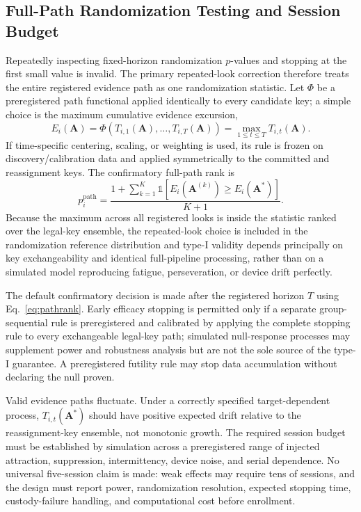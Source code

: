 \documentclass[11pt,letterpaper]{article}
\begin{document}
\subsection{Full-Path Randomization Testing and Session Budget}
\label{sec:sequential}
Repeatedly inspecting fixed-horizon randomization $p$-values and stopping at the first small value is invalid. The primary repeated-look correction therefore treats the entire registered evidence path as one randomization statistic. Let $\Phi$ be a preregistered path functional applied identically to every candidate key; a simple choice is the maximum cumulative evidence excursion,
\begin{equation}
E_i(\mathbf{A})=\Phi\!\left(T_{i,1}(\mathbf{A}),\ldots,T_{i,T}(\mathbf{A})\right)
=\max_{1\leq t\leq T} T_{i,t}(\mathbf{A}).
\label{eq:pathstat}
\end{equation}
If time-specific centering, scaling, or weighting is used, its rule is frozen on discovery/calibration data and applied symmetrically to the committed and reassignment keys. The confirmatory full-path rank is
\begin{equation}
p_i^{\mathrm{path}}=
\frac{1+\sum_{k=1}^{K}\mathbb{1}\!\left[E_i(\mathbf{A}^{(k)})\geq E_i(\mathbf{A}^{*})\right]}{K+1}.
\label{eq:pathrank}
\end{equation}
Because the maximum across all registered looks is inside the statistic ranked over the legal-key ensemble, the repeated-look choice is included in the randomization reference distribution and type-I validity depends principally on key exchangeability and identical full-pipeline processing, rather than on a simulated model reproducing fatigue, perseveration, or device drift perfectly.

The default confirmatory decision is made after the registered horizon $T$ using Eq.~\ref{eq:pathrank}. Early efficacy stopping is permitted only if a separate group-sequential rule is preregistered and calibrated by applying the complete stopping rule to every exchangeable legal-key path; simulated null-response processes may supplement power and robustness analysis but are not the sole source of the type-I guarantee. A preregistered futility rule may stop data accumulation without declaring the null proven.

Valid evidence paths fluctuate. Under a correctly specified target-dependent process, $T_{i,t}(\mathbf{A}^{*})$ should have positive expected drift relative to the reassignment-key ensemble, not monotonic growth. The required session budget must be established by simulation across a preregistered range of injected attraction, suppression, intermittency, device noise, and serial dependence. No universal five-session claim is made: weak effects may require tens of sessions, and the design must report power, randomization resolution, expected stopping time, custody-failure handling, and computational cost before enrollment.
\end{document}
